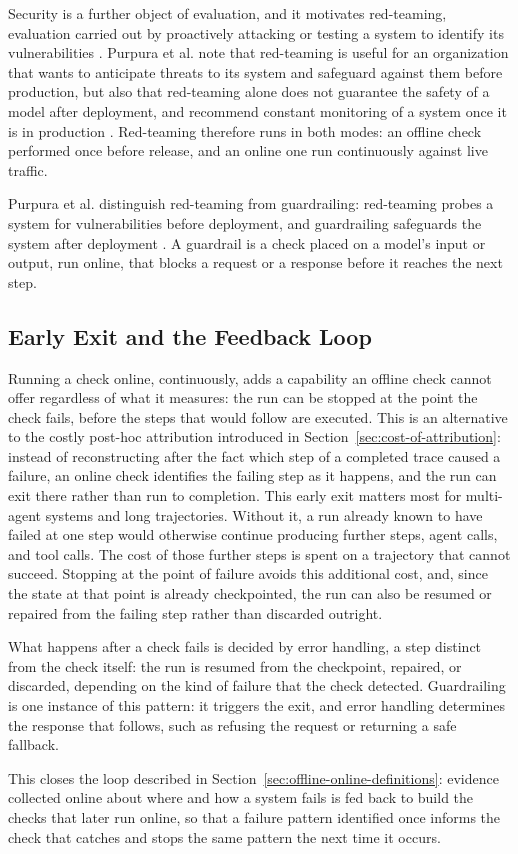 Security is a further object of evaluation, and it motivates red-teaming, evaluation carried out by proactively attacking or testing a system to identify its vulnerabilities \cite{purpuraBuildingSafeGenAI2025}. Purpura et al. note that red-teaming is useful for an organization that wants to anticipate threats to its system and safeguard against them before production, but also that red-teaming alone does not guarantee the safety of a model after deployment, and recommend constant monitoring of a system once it is in production \cite{purpuraBuildingSafeGenAI2025}. Red-teaming therefore runs in both modes: an offline check performed once before release, and an online one run continuously against live traffic.

Purpura et al. distinguish red-teaming from guardrailing: red-teaming probes a system for vulnerabilities before deployment, and guardrailing safeguards the system after deployment \cite{purpuraBuildingSafeGenAI2025}. A guardrail is a check placed on a model's input or output, run online, that blocks a request or a response before it reaches the next step.

\subsection{Early Exit and the Feedback Loop}
\label{sec:early-exit-feedback-loop}

Running a check online, continuously, adds a capability an offline check cannot offer regardless of what it measures: the run can be stopped at the point the check fails, before the steps that would follow are executed. This is an alternative to the costly post-hoc attribution introduced in Section~\ref{sec:cost-of-attribution}: instead of reconstructing after the fact which step of a completed trace caused a failure, an online check identifies the failing step as it happens, and the run can exit there rather than run to completion. This early exit matters most for multi-agent systems and long trajectories. Without it, a run already known to have failed at one step would otherwise continue producing further steps, agent calls, and tool calls. The cost of those further steps is spent on a trajectory that cannot succeed. Stopping at the point of failure avoids this additional cost, and, since the state at that point is already checkpointed, the run can also be resumed or repaired from the failing step rather than discarded outright.

What happens after a check fails is decided by error handling, a step distinct from the check itself: the run is resumed from the checkpoint, repaired, or discarded, depending on the kind of failure that the check detected. Guardrailing is one instance of this pattern: it triggers the exit, and error handling determines the response that follows, such as refusing the request or returning a safe fallback.

This closes the loop described in Section~\ref{sec:offline-online-definitions}: evidence collected online about where and how a system fails is fed back to build the checks that later run online, so that a failure pattern identified once informs the check that catches and stops the same pattern the next time it occurs.

